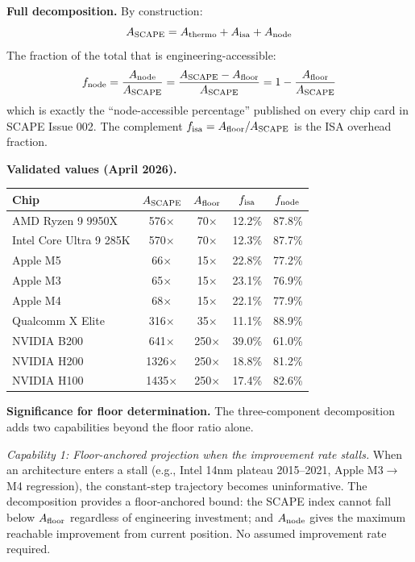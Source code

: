 \documentclass[12pt,a4paper]{article}
\begin{document}
\textbf{Full decomposition.} By construction:
\begin{equation}
A_{\rm SCAPE} = A_{\rm thermo} + A_{\rm isa} + A_{\rm node}
\end{equation}
The fraction of the total that is engineering-accessible:
\begin{equation}
f_{\rm node} = \frac{A_{\rm node}}{A_{\rm SCAPE}}
  = \frac{A_{\rm SCAPE} - A_{\rm floor}}{A_{\rm SCAPE}}
  = 1 - \frac{A_{\rm floor}}{A_{\rm SCAPE}}
\end{equation}
which is exactly the ``node-accessible percentage'' published on every chip card
in SCAPE Issue 002. The complement $f_{\rm isa} = A_{\rm floor}/A_{\rm SCAPE}$
is the ISA overhead fraction.

\textbf{Validated values (April 2026).}
\begin{center}
\begin{tabular}{lcccc}
\toprule
Chip & $A_{\rm SCAPE}$ & $A_{\rm floor}$ & $f_{\rm isa}$ & $f_{\rm node}$ \\
\midrule
AMD Ryzen 9 9950X & 576$\times$ & 70$\times$ & 12.2\% & 87.8\% \\
Intel Core Ultra 9 285K & 570$\times$ & 70$\times$ & 12.3\% & 87.7\% \\
Apple M5 & 66$\times$ & 15$\times$ & 22.8\% & 77.2\% \\
Apple M3 & 65$\times$ & 15$\times$ & 23.1\% & 76.9\% \\
Apple M4 & 68$\times$ & 15$\times$ & 22.1\% & 77.9\% \\
Qualcomm X Elite & 316$\times$ & 35$\times$ & 11.1\% & 88.9\% \\
NVIDIA B200 & 641$\times$ & 250$\times$ & 39.0\% & 61.0\% \\
NVIDIA H200 & 1326$\times$ & 250$\times$ & 18.8\% & 81.2\% \\
NVIDIA H100 & 1435$\times$ & 250$\times$ & 17.4\% & 82.6\% \\
\bottomrule
\end{tabular}
\end{center}

\textbf{Significance for floor determination.}
The three-component decomposition adds two capabilities beyond the floor ratio alone.

\emph{Capability 1: Floor-anchored projection when the improvement rate stalls.}
When an architecture enters a stall (e.g., Intel 14nm plateau 2015--2021,
Apple M3$\rightarrow$M4 regression), the constant-step trajectory becomes uninformative.
The decomposition provides a floor-anchored bound: the SCAPE index cannot fall below
$A_{\rm floor}$ regardless of engineering investment; and $A_{\rm node}$ gives the
maximum reachable improvement from current position. No assumed improvement rate required.
\end{document}
